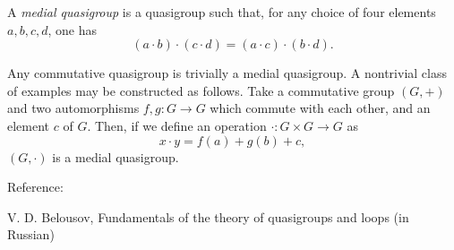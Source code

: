 \documentclass[12pt]{article}
\begin{document}
A \emph{medial quasigroup} is a quasigroup such that, for any choice of four elements $a,b,c,d$, one has
 \[ (a \cdot b) \cdot (c \cdot d) = (a \cdot c) \cdot (b\cdot d) .\]

Any commutative quasigroup is trivially a medial quasigroup.  A nontrivial class of examples may be constructed as follows.  Take a commutative group $(G,+)$ and two automorphisms $f, g \colon G \to G$ which commute with each other, and an element $c$ of $G$.  Then, if we define an operation $\cdot \colon G \times G \to G$ as 
 \[ x \cdot y = f(a) + g(b) + c ,\]
$(G,\cdot)$ is a medial quasigroup.

Reference:

 V. D. Belousov, Fundamentals of the theory of quasigroups and loops (in Russian)
\end{document}
